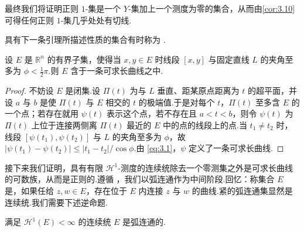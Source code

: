 最终我们将证明正则 $1$-集是一个 $Y$-集加上一个测度为零的集合，从而由\cref{cor:3.10} 可得任何正则 $1$-集几乎处处有切线.

具有下一条引理所描述性质的集合有时称为 .

\begin{lemma}\label{lem:3.11}
设 $E$ 是 $\mathbb{R}^n$ 的有界子集，使得当 $x,y\in E$ 时线段 $[x,y]$ 与固定直线 $L$ 的夹角至多为 $\phi<\frac{1}{2}\pi$.则 $E$ 含于一条可求长曲线之中.
\end{lemma}

\begin{proof}
不妨设 $E$ 是闭集.设 $\Pi(t)$ 为与 $L$ 垂直、距某原点距离为 $t$ 的超平面，并设 $a$ 与 $b$ 是使 $\Pi(t)$ 与 $E$ 相交的 $t$ 的极端值.于是对每个 $t$，$\Pi(t)$ 至多含 $E$ 的一个点；若存在就用 $\psi(t)$ 表示这个点，若不存在且 $a<t<b$，则令 $\psi(t)$ 为 $\Pi(t)$ 上位于连接两侧离 $\Pi(t)$ 最近的 $E$ 中的点的线段上的点.当 $t_1\neq t_2$ 时，线段 $[\psi(t_1),\psi(t_2)]$ 与 $L$ 的夹角至多为 $\phi$，故 $|\psi(t_1)-\psi(t_2)|\leq|t_1-t_2|/\cos\phi$.由 \eqref{eq:3.1}，$\psi$ 定义了一条可求长曲线.
\end{proof}

接下来我们证明，具有有限 $\mathcal{H}^1$-测度的连续统除去一个零测集之外是可求长曲线的可数族，从而是正则的.遵循 \textcite{besicovitch1938}，我们以弧连通作为中间阶段.回忆：称集合 $E$ 是，如果任给 $z,w\in E$，存在位于 $E$ 内连接 $z$ 与 $w$ 的曲线.紧的弧连通集显然是连续统.我们需要下述逆命题.

\begin{lemma}\label{lem:3.12}
满足 $\mathcal{H}^1(E)<\infty$ 的连续统 $E$ 是弧连通的.
\end{lemma}

